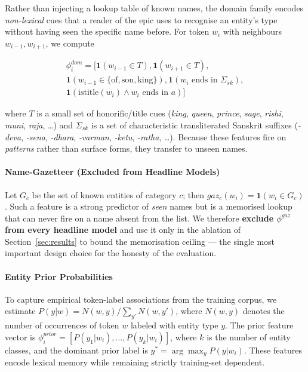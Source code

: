 \documentclass[conference]{IEEEtran}
\begin{document}
Rather than injecting a lookup table of known names, the domain family encodes \emph{non-lexical} cues that a reader of the epic uses to recognise an entity's type without having seen the specific name before. For token $w_i$ with neighbours $w_{i-1}, w_{i+1}$, we compute

\begin{multline*}
\phi_i^{dom} =
[
\mathbf{1}(w_{i-1}\!\in\!T),
\mathbf{1}(w_{i+1}\!\in\!T),\\
\mathbf{1}(w_{i-1}\!\in\!\{\text{of},\text{son},\text{king}\}),
\mathbf{1}(w_i \text{ ends in } \Sigma_{sk}),\\
\mathbf{1}(\text{istitle}(w_i)\wedge w_i \text{ ends in } a)
]
\end{multline*}

where $T$ is a small set of honorific/title cues (\emph{king}, \emph{queen}, \emph{prince}, \emph{sage}, \emph{rishi}, \emph{muni}, \emph{raja}, \dots) and $\Sigma_{sk}$ is a set of characteristic transliterated Sanskrit suffixes (\emph{-deva}, \emph{-sena}, \emph{-dhara}, \emph{-varman}, \emph{-ketu}, \emph{-ratha}, \dots). Because these features fire on \emph{patterns} rather than surface forms, they transfer to unseen names.

\paragraph{Name-Gazetteer (Excluded from Headline Models)}
\label{sec:gaz}

Let $G_c$ be the set of known entities of category $c$; then $gaz_c(w_i)=\mathbf{1}(w_i \in G_c)$. Such a feature is a strong predictor of \emph{seen} names but is a memorised lookup that can never fire on a name absent from the list. We therefore \textbf{exclude $\phi^{gaz}$ from every headline model} and use it only in the ablation of Section~\ref{sec:results} to bound the memorisation ceiling --- the single most important design choice for the honesty of the evaluation.

\paragraph{Entity Prior Probabilities}

To capture empirical token-label associations from the training corpus, we estimate \(P(y|w) = N(w,y) / \sum_{y'} N(w,y')\), where \(N(w,y)\) denotes the number of occurrences of token \(w\) labeled with entity type \(y\). The prior feature vector is \(\phi_i^{prior} = [P(y_1|w_i),...,P(y_k|w_i)]\), where \(k\) is the number of entity classes, and the dominant prior label is \(y^* = \arg\max_y P(y|w_i)\). These features encode lexical memory while remaining strictly training-set dependent.
\end{document}
